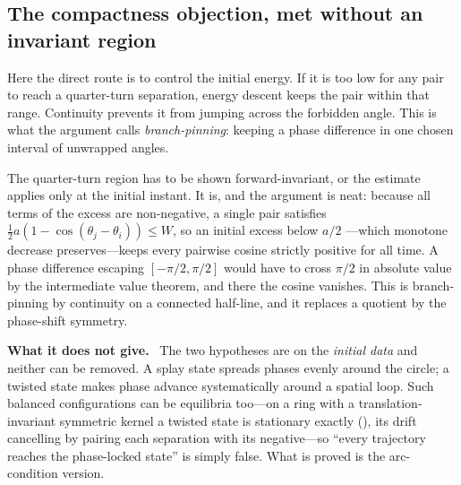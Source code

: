 \documentclass[11pt]{article}
\newcommand{\scope}{\par\smallskip\noindent\textbf{What it does not give.}\ }
\newcommand{\id}[1]{{\small\ttfamily\seqsplit{#1}}}
\begin{document}
\subsection{The compactness objection, met without an invariant region}

Here the direct route is to control the initial energy. If it is too low for
any pair to reach a quarter-turn separation, energy descent keeps the pair
within that range. Continuity prevents it from jumping across the forbidden
angle. This is what the argument calls \emph{branch-pinning}: keeping a phase
difference in one chosen interval of unwrapped angles.

The quarter-turn region has to be shown forward-invariant, or the estimate
applies only at the initial instant. It is, and the argument is neat: because
all terms of the excess are non-negative, a single pair satisfies
$\tfrac12 a(1-\cos(\theta_j-\theta_i))\le W$, so an initial excess below $a/2$
---which monotone decrease preserves---keeps every pairwise cosine strictly
positive for all time. A phase difference escaping $[-\pi/2,\pi/2]$ would have
to cross $\pi/2$ in absolute value by the intermediate value theorem, and there
the cosine vanishes. This is branch-pinning by continuity on a connected
half-line, and it replaces a quotient by the phase-shift symmetry.

\scope
The two hypotheses are on the \emph{initial data} and neither can be removed.
A splay state spreads phases evenly around the circle; a twisted state makes
phase advance systematically around a spatial loop. Such balanced
configurations can be equilibria too---on a ring with a translation-invariant
symmetric kernel a twisted state is stationary exactly
(\id{winding\_is\_kuramoto\_trajectory}), its drift cancelling by pairing each
separation with its negative---so ``every trajectory
reaches the phase-locked state'' is simply false. What is proved is the
arc-condition version.
\end{document}

